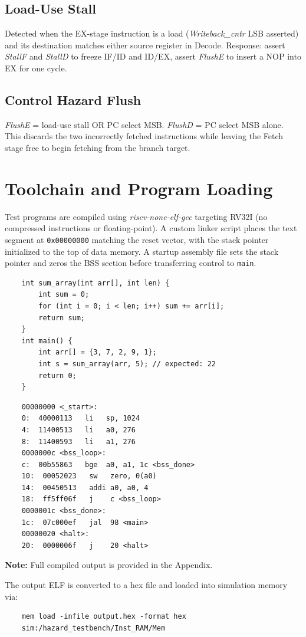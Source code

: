 \subsection{Load-Use Stall}
Detected when the EX-stage instruction is a load (\textit{Writeback\_cntr} LSB asserted) and its destination matches either source register in Decode. Response: assert \textit{StallF} and \textit{StallD} to freeze IF/ID and ID/EX, assert \textit{FlushE} to insert a NOP into EX for one cycle.

\subsection{Control Hazard Flush}
\textit{FlushE} = load-use stall OR PC select MSB. \textit{FlushD} = PC select MSB alone. This discards the two incorrectly fetched instructions while leaving the Fetch stage free to begin fetching from the branch target.

\section{Toolchain and Program Loading}
Test programs are compiled using \textit{riscv-none-elf-gcc} targeting RV32I (no compressed instructions or floating-point). A custom linker script places the text segment at \texttt{0x00000000} matching the reset vector, with the stack pointer initialized to the top of data memory. A startup assembly file sets the stack pointer and zeros the BSS section before transferring control to \texttt{main}.

\begin{verbatim}
	int sum_array(int arr[], int len) {
		int sum = 0;
		for (int i = 0; i < len; i++) sum += arr[i];
		return sum;
	}
	int main() {
		int arr[] = {3, 7, 2, 9, 1};
		int s = sum_array(arr, 5); // expected: 22
		return 0;
	}
\end{verbatim}

\begin{verbatim}
	00000000 <_start>:
	0:  40000113   li   sp, 1024
	4:  11400513   li   a0, 276
	8:  11400593   li   a1, 276
	0000000c <bss_loop>:
	c:  00b55863   bge  a0, a1, 1c <bss_done>
	10:  00052023   sw   zero, 0(a0)
	14:  00450513   addi a0, a0, 4
	18:  ff5ff06f   j    c <bss_loop>
	0000001c <bss_done>:
	1c:  07c000ef   jal  98 <main>
	00000020 <halt>:
	20:  0000006f   j    20 <halt>
\end{verbatim}
\textbf{Note:} Full compiled output is provided in the Appendix.

The output ELF is converted to a hex file and loaded into simulation memory via:
\begin{verbatim}
	mem load -infile output.hex -format hex
	sim:/hazard_testbench/Inst_RAM/Mem
\end{verbatim}


